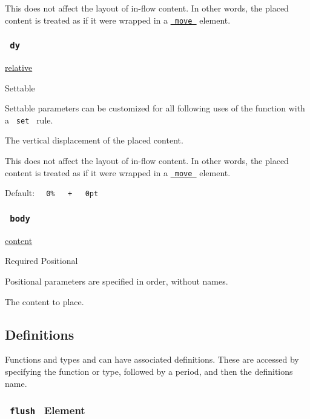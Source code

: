This does not affect the layout of in-flow content. In other words, the
placed content is treated as if it were wrapped in a
\href{/docs/reference/layout/move/}{\texttt{\ move\ }} element.

\subsubsection{\texorpdfstring{\texttt{\ dy\ }}{ dy }}\label{parameters-dy}

\href{/docs/reference/layout/relative/}{relative}

{{ Settable }}

\label{parameters-dy-settable-tooltip}
Settable parameters can be customized for all following uses of the
function with a \texttt{\ set\ } rule.

The vertical displacement of the placed content.

This does not affect the layout of in-flow content. In other words, the
placed content is treated as if it were wrapped in a
\href{/docs/reference/layout/move/}{\texttt{\ move\ }} element.

Default:
\texttt{\ }{\texttt{\ 0\%\ }}\texttt{\ }{\texttt{\ +\ }}\texttt{\ }{\texttt{\ 0pt\ }}\texttt{\ }

\subsubsection{\texorpdfstring{\texttt{\ body\ }}{ body }}\label{parameters-body}

\href{/docs/reference/foundations/content/}{content}

{Required} {{ Positional }}

\label{parameters-body-positional-tooltip}
Positional parameters are specified in order, without names.

The content to place.

\subsection{\texorpdfstring{{ Definitions
}}{ Definitions }}\label{definitions}

\label{definitions-tooltip}
Functions and types and can have associated definitions. These are
accessed by specifying the function or type, followed by a period, and
then the definition\textquotesingle s name.

\subsubsection{\texorpdfstring{\texttt{\ flush\ } {{ Element
}}}{ flush   Element }}\label{definitions-flush}

